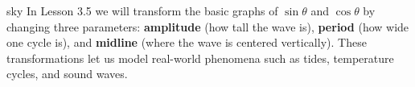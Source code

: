 \documentclass[10pt]{article}
\begin{document}
\vspace{0.1in}

\begin{blurbbox}{sky}
In Lesson 3.5 we will transform the basic graphs of $\sin\theta$ and $\cos\theta$ by
changing three parameters: \textbf{amplitude} (how tall the wave is), \textbf{period}
(how wide one cycle is), and \textbf{midline} (where the wave is centered vertically).
These transformations let us model real-world phenomena such as tides, temperature cycles,
and sound waves.
\end{blurbbox}
\end{document}
